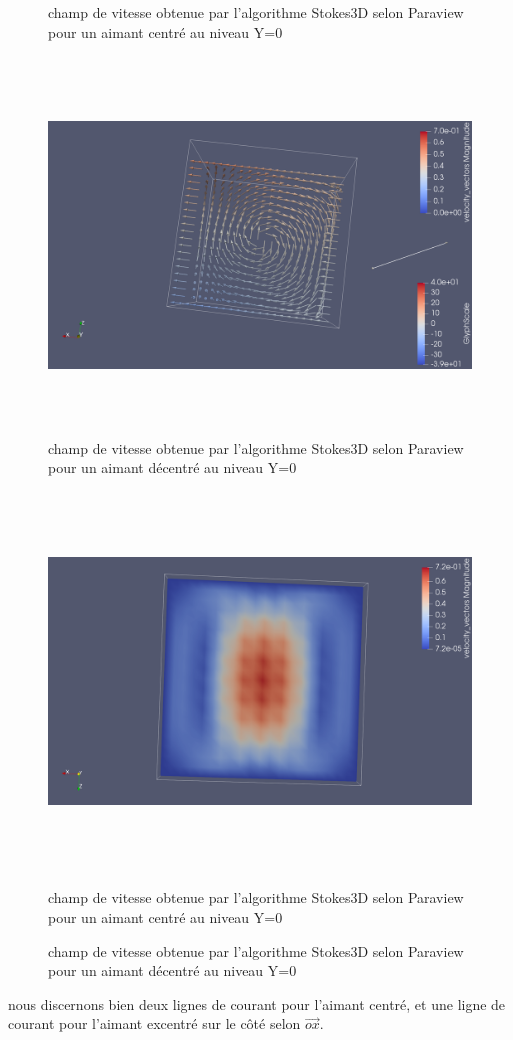 \documentclass[a4paper,12pt,titlepage]{report}
\begin{document}
\begin{onehalfspace}
\begin{figure}[!h]
\caption{\label{figure 3 } champ de vitesse obtenue par l'algorithme Stokes3D selon Paraview pour un aimant centré au niveau Y=0}
\includegraphics[height = 10cm, keepaspectratio]{graphes/Champ_de_vitesse_selon_Y.png} 
\caption{\label{figure 3 } champ de vitesse obtenue par l'algorithme Stokes3D selon Paraview pour un aimant décentré au niveau Y=0}


\end{figure}
\begin{figure}[!h]

\includegraphics[height = 10cm, keepaspectratio]{graphes/Champ_de_vitesse_selon_Y_centre_ampli.png} 
\caption{\label{figure 3 } champ de vitesse obtenue par l'algorithme Stokes3D selon Paraview pour un aimant centré au niveau Y=0}
\caption{\label{figure 3 } champ de vitesse obtenue par l'algorithme Stokes3D selon Paraview pour un aimant décentré au niveau Y=0}
\end{figure}
nous discernons bien deux lignes de courant pour l'aimant centré, et une ligne de courant pour l'aimant excentré sur le côté selon $\vec{ox}$.



\end{onehalfspace}
\end{document}
